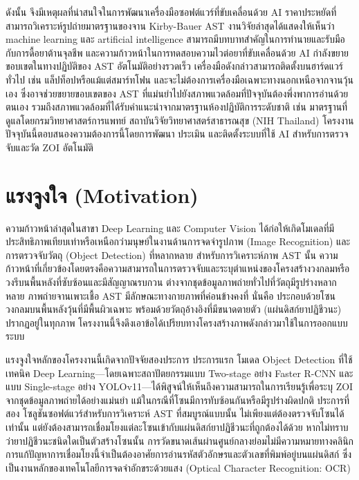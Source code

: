 ดังนั้น จึงมีเหตุผลที่น่าสนใจในการพัฒนาเครื่องมือซอฟต์แวร์ที่ขับเคลื่อนด้วย AI ราคาประหยัดที่สามารถวิเคราะห์รูปถ่ายมาตรฐานของจาน Kirby-Bauer AST งานวิจัยล่าสุดได้แสดงให้เห็นว่า machine learning และ artificial intelligence สามารถมีบทบาทสำคัญในการทำนายและรับมือกับการดื้อยาต้านจุลชีพ \cite{bilal2025} และความก้าวหน้าในการทดสอบความไวต่อยาที่ขับเคลื่อนด้วย AI กำลังขยายขอบเขตในทางปฏิบัติของ AST อัตโนมัติอย่างรวดเร็ว \cite{liao2025} เครื่องมือดังกล่าวสามารถติดตั้งบนฮาร์ดแวร์ทั่วไป เช่น แล็ปท็อปหรือแม้แต่สมาร์ทโฟน และจะไม่ต้องการเครื่องมือเฉพาะทางนอกเหนือจากจานวุ้นเอง ซึ่งอาจช่วยขยายขอบเขตของ AST ที่แม่นยำไปยังสภาพแวดล้อมที่ปัจจุบันต้องพึ่งพาการอ่านด้วยตนเอง รวมถึงสภาพแวดล้อมที่ได้รับคำแนะนำจากมาตรฐานห้องปฏิบัติการระดับชาติ เช่น มาตรฐานที่ดูแลโดยกรมวิทยาศาสตร์การแพทย์ สถาบันวิจัยวิทยาศาสตร์สาธารณสุข (NIH Thailand) \cite{dmsc_nih} โครงงานปัจจุบันนี้ตอบสนองความต้องการนี้โดยการพัฒนา ประเมิน และติดตั้งระบบที่ใช้ AI สำหรับการตรวจจับและวัด ZOI อัตโนมัติ

\section{แรงจูงใจ (Motivation)}

ความก้าวหน้าล่าสุดในสาขา Deep Learning และ Computer Vision ได้ก่อให้เกิดโมเดลที่มีประสิทธิภาพเทียบเท่าหรือเหนือกว่ามนุษย์ในงานด้านการจดจำรูปภาพ (Image Recognition) และการตรวจจับวัตถุ (Object Detection) ที่หลากหลาย สำหรับการวิเคราะห์ภาพ AST นั้น ความก้าวหน้าที่เกี่ยวข้องโดยตรงคือความสามารถในการตรวจจับและระบุตำแหน่งของโครงสร้างวงกลมหรือวงรีบนพื้นหลังที่ซับซ้อนและมีสัญญาณรบกวน ต่างจากชุดข้อมูลภาพถ่ายทั่วไปที่วัตถุมีรูปร่างหลากหลาย ภาพถ่ายจานเพาะเชื้อ AST มีลักษณะทางกายภาพที่ค่อนข้างคงที่ นั่นคือ ประกอบด้วยโซนวงกลมบนพื้นหลังวุ้นที่มีพื้นผิวเฉพาะ พร้อมด้วยวัตถุอ้างอิงที่มีขนาดตายตัว (แผ่นดิสก์ยาปฏิชีวนะ) ปรากฏอยู่ในทุกภาพ โครงงานนี้จึงดึงเอาข้อได้เปรียบทางโครงสร้างภาพดังกล่าวมาใช้ในการออกแบบระบบ

แรงจูงใจหลักของโครงงานนี้เกิดจากปัจจัยสองประการ ประการแรก โมเดล Object Detection ที่ใช้เทคนิค Deep Learning---โดยเฉพาะสถาปัตยกรรมแบบ Two-stage อย่าง Faster R-CNN และแบบ Single-stage อย่าง YOLOv11---ได้พิสูจน์ให้เห็นถึงความสามารถในการเรียนรู้เพื่อระบุ ZOI จากชุดข้อมูลภาพถ่ายได้อย่างแม่นยำ แม้ในกรณีที่โซนมีการทับซ้อนกันหรือมีรูปร่างผิดปกติ ประการที่สอง โซลูชันซอฟต์แวร์สำหรับการวิเคราะห์ AST ที่สมบูรณ์แบบนั้น ไม่เพียงแต่ต้องตรวจจับโซนได้เท่านั้น แต่ยังต้องสามารถเชื่อมโยงแต่ละโซนเข้ากับแผ่นดิสก์ยาปฏิชีวนะที่ถูกต้องได้ด้วย หากไม่ทราบว่ายาปฏิชีวนะชนิดใดเป็นตัวสร้างโซนนั้น การวัดขนาดเส้นผ่านศูนย์กลางย่อมไม่มีความหมายทางคลินิก การแก้ปัญหาการเชื่อมโยงนี้จำเป็นต้องอาศัยการอ่านรหัสตัวอักษรและตัวเลขที่พิมพ์อยู่บนแผ่นดิสก์ ซึ่งเป็นงานหลักของเทคโนโลยีการจดจำอักขระด้วยแสง (Optical Character Recognition: OCR)

